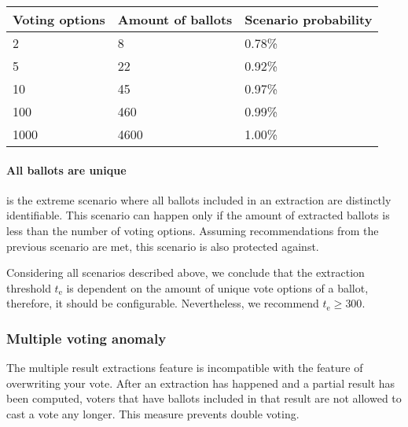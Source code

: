 \begin{center}
    \begin{tabular}{|l|l|l|} \hline
        Voting options & Amount of ballots & Scenario probability \\ \hline

        2 & 8 & 0.78\% \\ \hline
        5 & 22 & 0.92\% \\ \hline
        10 & 45 & 0.97\% \\ \hline
        100 & 460 & 0.99\% \\ \hline
        1000 & 4600 & 1.00\% \\ \hline
    \end{tabular}    
\end{center}

\paragraph{All ballots are unique} is the extreme scenario where all ballots included in an extraction are distinctly identifiable. This scenario can happen only if the amount of extracted ballots is less than the number of voting options. Assuming recommendations from the previous scenario are met, this scenario is also protected against. 

Considering all scenarios described above, we conclude that the extraction threshold $t_\mathrm{e}$ is dependent on the amount of unique vote options of a ballot, therefore, it should be configurable. Nevertheless, we recommend $t_\mathrm{e} \geq 300$.


\subsubsection{Multiple voting anomaly}
The multiple result extractions feature is incompatible with the feature of overwriting your vote. After an extraction has happened and a partial result has been computed, voters that have ballots included in that result are not allowed to cast a vote any longer. This measure prevents double voting.
